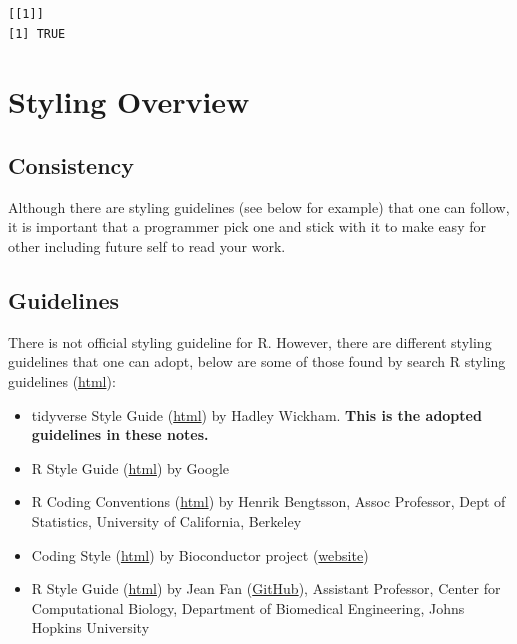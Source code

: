 \documentclass[
  letterpaper,
  DIV=11,
  numbers=noendperiod]{scrreprt}
\providecommand{\tightlist}{%
  \setlength{\itemsep}{0pt}\setlength{\parskip}{0pt}}\usepackage{longtable,booktabs,array}
\begin{document}
\begin{verbatim}
[[1]]
[1] TRUE
\end{verbatim}

\section{Styling Overview}\label{styling-overview}

\subsection{Consistency}\label{consistency}

Although there are styling guidelines (see below for example) that one
can follow, it is important that a programmer pick one and stick with it
to make easy for other including future self to read your work.

\subsection{Guidelines}\label{guidelines}

There is not official styling guideline for R. However, there are
different styling guidelines that one can adopt, below are some of those
found by search R styling guidelines
(\href{https://www.google.com/search?q=r+styling+guidlines&oq=r+styling+guidlines}{html}):

\begin{itemize}
\tightlist
\item
  tidyverse Style Guide (\href{https://style.tidyverse.org/}{html}) by
  Hadley Wickham. \textbf{This is the adopted guidelines in these
  notes.}
\item
  R Style Guide
  (\href{https://google.github.io/styleguide/Rguide.html}{html}) by
  Google
\item
  R Coding Conventions
  (\href{https://docs.google.com/document/d/1esDVxyWvH8AsX-VJa-8oqWaHLs4stGlIbk8kLc5VlII/preview}{html})
  by Henrik Bengtsson, Assoc Professor, Dept of Statistics, University
  of California, Berkeley
\item
  Coding Style
  (\href{https://contributions.bioconductor.org/r-code.html\#r-code}{html})
  by Bioconductor project (\href{https://bioconductor.org/}{website})
\item
  R Style Guide (\href{https://jef.works/R-style-guide/}{html}) by Jean
  Fan (\href{https://github.com/JEFworks}{GitHub}), Assistant Professor,
  Center for Computational Biology, Department of Biomedical
  Engineering, Johns Hopkins University
\end{itemize}
\end{document}
